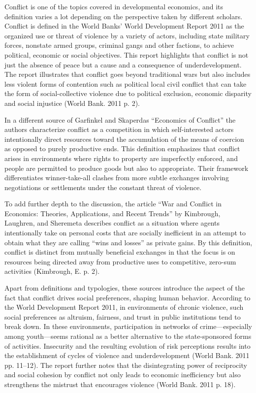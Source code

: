 \documentclass[14pt]{article}
\theoremstyle{remark}
\begin{document}
Conflict is one of the topics covered in developmental economics, and its definition varies a lot depending on the perspective taken by different scholars. Conflict is defined in the World Banks' World Development Report 2011 as the organized use or threat of violence by a variety of actors, including state military forces, nonstate armed groups, criminal gangs and other factions, to achieve political, economic or social objectives. This report highlights that conflict is not just the absence of peace but a cause and a consequence of underdevelopment. The report illustrates that conflict goes beyond traditional wars but also includes less violent forms of contention such as political local civil conflict that can take the form of social-collective violence due to political exclusion, economic disparity and social injustice (World Bank. 2011 p. 2).

In a different source of Garfinkel and Skaperdas ``Economics of Conflict'' the authors characterize conflict as a competition in which self-interested actors intentionally direct resources toward the accumulation of the means of coercion as opposed to purely productive ends. This definition emphasizes that conflict arises in environments where rights to property are imperfectly enforced, and people are permitted to produce goods but also to appropriate. Their framework differentiates winner-take-all clashes from more subtle exchanges involving negotiations or settlements under the constant threat of violence.

To add further depth to the discussion, the article ``War and Conflict in Economics: Theories, Applications, and Recent Trends'' by Kimbrough, Laughren, and Sheremeta describes conflict as a situation where agents intentionally take on personal costs that are socially inefficient in an attempt to obtain what they are calling ``wins and losses'' as private gains. By this definition, conflict is distinct from mutually beneficial exchanges in that the focus is on resources being directed away from productive uses to competitive, zero-sum activities (Kimbrough, E. p. 2).

Apart from definitions and typologies, these sources introduce the aspect of the fact that conflict drives social preferences, shaping human behavior. According to the World Development Report 2011, in environments of chronic violence, such social preferences as altruism, fairness, and trust in public institutions tend to break down. In these environments, participation in networks of crime---especially among youth---seems rational as a better alternative to the state-sponsored forms of activities. Insecurity and the resulting evolution of risk perceptions results into the establishment of cycles of violence and underdevelopment (World Bank. 2011 pp. 11--12). The report further notes that the disintegrating power of reciprocity and social cohesion by conflict not only leads to economic inefficiency but also strengthens the mistrust that encourages violence (World Bank. 2011 p. 18).
\end{document}
